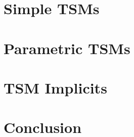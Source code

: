 \documentclass[12pt]{cmuthesis}
\newcommand{\todolater}[1]{{\color{magenta} TODO (Later): #1}}
\begin{document}
\part{Simple TSMs}\label{part:simple-tsms}



\part{Parametric TSMs}\label{part:parametric-tsms}



\part{TSM Implicits}\label{part:implicits}


\part{Conclusion}



\renewcommand{\bibsection}{\chapter*{\bibname}\addcontentsline{toc}{chapter}{Bibliography}}
\renewcommand{\bibpreamble}{\todolater{List conference abbreviations.}\\
\todolater{Remove extraneous nonsense from entries.}}





\end{document}
